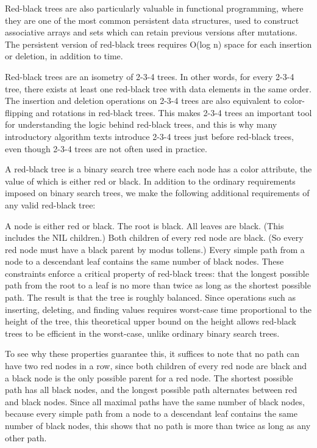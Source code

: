 \documentclass[12pt]{article}
\begin{document}
Red-black trees are also particularly valuable in functional programming, where they are one of the most common persistent data structures, used to construct associative arrays and sets which can retain previous versions after mutations. The persistent version of red-black trees requires O(log n) space for each insertion or deletion, in addition to time.

Red-black trees are an isometry of 2-3-4 trees. In other words, for every 2-3-4 tree, there exists at least one red-black tree with data elements in the same order. The insertion and deletion operations on 2-3-4 trees are also equivalent to color-flipping and rotations in red-black trees. This makes 2-3-4 trees an important tool for understanding the logic behind red-black trees, and this is why many introductory algorithm texts introduce 2-3-4 trees just before red-black trees, even though 2-3-4 trees are not often used in practice.

A red-black tree is a binary search tree where each node has a color attribute, the value of which is either red or black. In addition to the ordinary requirements imposed on binary search trees, we make the following additional requirements of any valid red-black tree:

A node is either red or black. 
The root is black. 
All leaves are black. (This includes the NIL children.) 
Both children of every red node are black. (So every red node must have a black parent by modus tollens.) 
Every simple path from a node to a descendant leaf contains the same number of black nodes. 
These constraints enforce a critical property of red-black trees: that the longest possible path from the root to a leaf is no more than twice as long as the shortest possible path. The result is that the tree is roughly balanced. Since operations such as inserting, deleting, and finding values requires worst-case time proportional to the height of the tree, this theoretical upper bound on the height allows red-black trees to be efficient in the worst-case, unlike ordinary binary search trees.

To see why these properties guarantee this, it suffices to note that no path can have two red nodes in a row, since both children of every red node are black and a black node is the only possible parent for a red node. The shortest possible path has all black nodes, and the longest possible path alternates between red and black nodes. Since all maximal paths have the same number of black nodes, because every simple path from a node to a descendant leaf contains the same number of black nodes, this shows that no path is more than twice as long as any other path.
\end{document}
